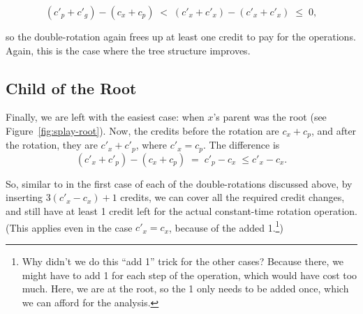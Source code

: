\[ 
(c'_p + c'_g) - (c_x + c_p)
\; < \; (c'_x + c'_x) - (c'_x + c'_x)
\; \leq \; 0,
\]

so the double-rotation again frees up at least one credit to pay for
the operations. Again, this is the case where the tree structure
improves. 

\subsection{Child of the Root}
Finally, we are left with the easiest case: when $x$'s parent was the
root (see Figure~\ref{fig:splay-root}). 
Now, the credits before the rotation are $c_x + c_p$, and after the
rotation, they are $c'_x + c'_p$, where $c'_x = c_p$. 
The difference is
\[ (c'_x + c'_p) - (c_x + c_p)
\; = \; c'_p - c_x
\; \leq c'_x - c_x.
\]

So, similar to in the first case of each of the double-rotations
discussed above, by inserting $3(c'_x - c_x)+1$ credits, we can cover
all the required credit changes, and still have at least 1 credit left
for the actual constant-time rotation operation. 
(This applies even in the case $c'_x = c_x$, because of the added
1.\footnote{Why didn't we do this ``add 1'' trick for the other cases?
  Because there, we might have to add 1 for each step of the
   operation, which would have cost too much. Here, we are
  at the root, so the 1 only needs to be added once, which we can
  afford for the analysis.})
